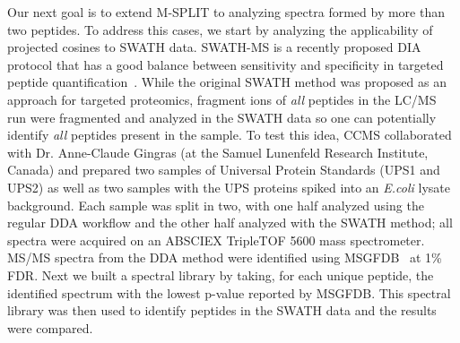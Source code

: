 \documentclass[arial,11pt]{article}
\begin{document}
Our next goal is to extend M-SPLIT to analyzing spectra formed by more than two peptides. To address this cases,
we start by analyzing the applicability of projected cosines to SWATH data.
SWATH-MS is a recently proposed DIA protocol that has a good balance between sensitivity and specificity in targeted peptide quantification~\cite{Gillet12targeted}.  While the original SWATH method was proposed as an approach for targeted proteomics, fragment ions of \emph{all} peptides in the LC/MS run were fragmented and analyzed in the SWATH data so one can potentially identify {\em all} peptides present in the sample. To test this idea, CCMS collaborated with Dr. Anne-Claude Gingras (at the Samuel Lunenfeld Research Institute, Canada) and prepared two samples of Universal Protein Standards (UPS1 and UPS2) as well as two samples with the UPS proteins spiked into an {\em E.coli} lysate background. Each sample was split in two, with one half analyzed using the regular DDA workflow and the other half analyzed with the SWATH method; all spectra were acquired on an ABSCIEX TripleTOF 5600 mass spectrometer. MS/MS spectra from the DDA method were identified using MSGFDB~\cite{kim10cidetd} at 1\% FDR. Next we built a spectral library by taking, for each unique peptide, the identified spectrum with the lowest p-value reported by MSGFDB.  This spectral library was then used to identify peptides in the SWATH data and the results were compared.  %
\end{document}
